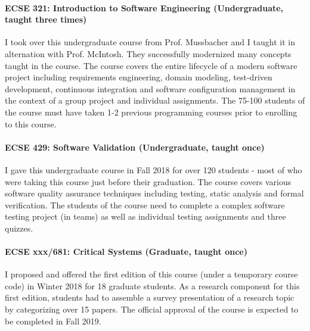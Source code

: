 \paragraph{ECSE 321: Introduction to Software Engineering (Undergraduate, taught three times)}
I took over this undergraduate course from Prof. Mussbacher and I taught it in alternation with Prof. McIntosh. They successfully modernized many concepts taught in the course. The course covers the entire lifecycle of a modern software project including requirements engineering, domain modeling, test-driven development, continuous integration and software configuration management in the context of a group project and individual assignments. The 75-100 students of the course must have taken 1-2 previous programming courses prior to enrolling to this course. 

\paragraph{ECSE 429: Software Validation (Undergraduate, taught once)}

I gave this undergraduate course in Fall 2018 for over 120 students - most of who were taking this course just before their graduation. The course covers various software quality assurance techniques including testing, static analysis and formal verification. The students of the course need to complete a complex software testing project (in teams) as well as individual testing assignments and three quizzes.

\paragraph{ECSE xxx/681: Critical Systems (Graduate, taught once)}

I proposed and offered the first edition of this course (under a temporary course code) in Winter 2018 for 18 graduate students. As a research component for this first edition, students had to assemble a survey presentation of a research topic by categorizing over 15 papers. The official approval of the course is expected to be completed in Fall 2019. 

